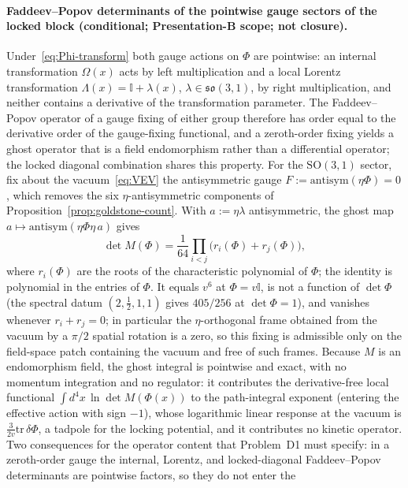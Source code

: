 \paragraph{Faddeev--Popov determinants of the pointwise gauge sectors of the locked block (conditional; Presentation-B scope; not closure).}
Under~\eqref{eq:Phi-transform} both gauge actions on \(\Phi\) are pointwise: an
internal transformation \(\Omega(x)\) acts by left multiplication and a local
Lorentz transformation \(\Lambda(x)=\mathbb{I}+\lambda(x)\),
\(\lambda\in\mathfrak{so}(3,1)\), by right multiplication, and neither contains
a derivative of the transformation parameter. The Faddeev--Popov operator of a
gauge fixing of either group therefore has order equal to the derivative order
of the gauge-fixing functional, and a zeroth-order fixing yields a ghost
operator that is a field endomorphism rather than a differential operator; the
locked diagonal combination shares this property. For the
\(\mathrm{SO}(3,1)\) sector, fix about the vacuum~\eqref{eq:VEV} the
antisymmetric gauge \(F:=\mathrm{antisym}(\eta\Phi)=0\), which removes the six
\(\eta\)-antisymmetric components of Proposition~\ref{prop:goldstone-count}.
With \(a:=\eta\lambda\) antisymmetric, the ghost map
\(a\mapsto\mathrm{antisym}(\eta\Phi\eta\,a)\) gives
\[
  \det M(\Phi)=\frac{1}{64}\prod_{i<j}\bigl(r_i(\Phi)+r_j(\Phi)\bigr),
\]
where \(r_i(\Phi)\) are the roots of the characteristic polynomial of \(\Phi\);
the identity is polynomial in the entries of \(\Phi\). It equals \(v^{6}\) at
\(\Phi=v\mathbb{I}\), is not a function of \(\det\Phi\) (the spectral datum
\((2,\tfrac12,1,1)\) gives \(405/256\) at \(\det\Phi=1\)), and vanishes whenever
\(r_i+r_j=0\); in particular the \(\eta\)-orthogonal frame obtained from the
vacuum by a \(\pi/2\) spatial rotation is a zero, so this fixing is admissible
only on the field-space patch containing the vacuum and free of such frames.
Because \(M\) is an endomorphism field, the ghost integral is pointwise and
exact, with no momentum integration and no regulator: it contributes the
derivative-free local functional \(\int d^{4}x\,\ln\det M(\Phi(x))\) to the path-integral exponent (entering
the effective action with sign \(-1\)), whose logarithmic linear response at
the vacuum is \(\frac{3}{2v}\mathrm{tr}\,\delta\Phi\), a tadpole for the locking
potential, and it contributes no kinetic operator. Two
consequences for the operator content that Problem~D1 must specify: in a
zeroth-order gauge the internal, Lorentz, and locked-diagonal
Faddeev--Popov determinants are pointwise factors, so they do not enter the
